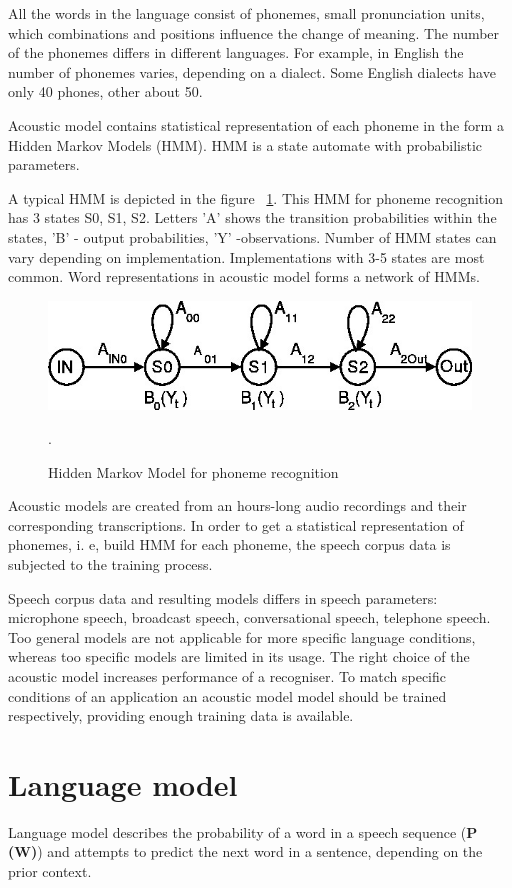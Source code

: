 \documentclass[11pt,a4paper]{report}
\begin{document}
 All the words in the language consist of phonemes, small
pronunciation units, which combinations and positions influence the change of meaning. The number
of the phonemes differs in different languages. For example, in English the
number of phonemes varies, depending on a dialect.  Some English dialects
have only 40 phones, other about 50. 

 
Acoustic model contains statistical representation of each
phoneme in the form a Hidden Markov Models (HMM). HMM is a state automate with probabilistic
parameters.

A typical HMM is depicted in the figure
~\ref{fig:hmm}.  This HMM for phoneme recognition has 3 states  S0, S1, S2.
Letters 'A' shows the transition probabilities within the states, 'B' - output
probabilities, 'Y' -observations. Number of HMM states can vary depending on
implementation. Implementations with 3-5 states are most common. Word
representations in acoustic model forms a network of HMMs.  
\begin {figure} [h]
  \begin {center}
    \includegraphics[]{HMM}
    \caption {Hidden Markov Model for phoneme recognition \citep{jurafsky-martin-2009}}.
    \label {fig:hmm}
  \end {center}
\end {figure}
  Acoustic models are created from an hours-long audio recordings and
their corresponding transcriptions. In order to get a statistical
representation of phonemes, i. e, build HMM for each phoneme, the speech corpus
data is subjected to the training process.  

 Speech corpus
data and resulting models differs in speech parameters: microphone speech, broadcast speech,
conversational speech, telephone speech. Too general models are not applicable
for more specific  language conditions, whereas too specific models are limited
in its usage. The  right choice of the acoustic model increases performance
of a recogniser. To match specific conditions of an application an
acoustic model model should be trained respectively, providing enough training
data is available. 

\section {Language model}
Language model describes the probability of a word in a speech sequence
(\textbf{P (W)}) and attempts to predict the next word in a sentence, depending
on the prior context. 
\end{document}
